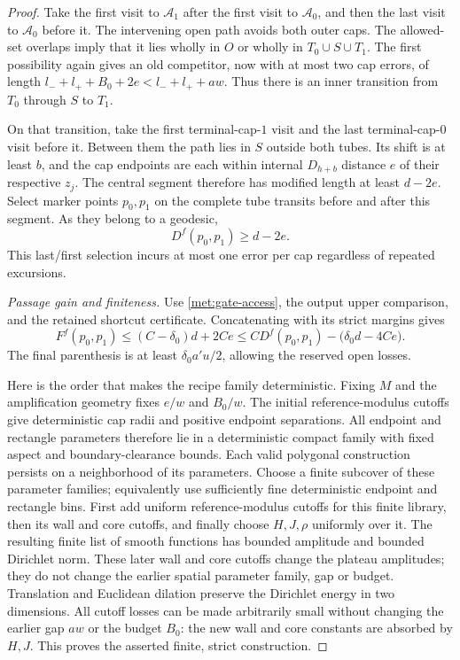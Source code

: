 \documentclass[11pt]{article}
\numberwithin{equation}{section}
\theoremstyle{definition}
\theoremstyle{remark}
\newcommand{\1}{\mathbf 1}
\begin{document}
\begin{proof}
Take the first visit to $\mathcal A_1$ after the first visit to
$\mathcal A_0$, and then the last visit to $\mathcal A_0$ before it.
The intervening open path avoids both outer caps.  The allowed-set
overlaps imply that it lies wholly in $O$ or wholly in
$T_0\cup S\cup T_1$.  The first possibility again gives an old
competitor, now with at most two cap errors, of length
$l_-+l_++B_0+2e<l_-+l_++aw$.  Thus there is an inner transition
from $T_0$ through $S$ to $T_1$.

On that transition, take the first terminal-cap-$1$ visit and the
last terminal-cap-$0$ visit before it.  Between them the path lies
in $S$ outside both tubes.  Its shift is at least $b$, and the cap
endpoints are each within internal $D_{h+b}$ distance $e$ of their
respective $z_j$.  The central segment therefore has modified length
at least $d-2e$.  Select marker points $p_0,p_1$ on the complete tube
transits before and after this segment.  As they belong to a
geodesic,
\[
 D^f(p_0,p_1)\geq d-2e.
\]
This last/first selection incurs at most one error per cap regardless
of repeated excursions.

\emph{Passage gain and finiteness.}
Use \eqref{met:gate-access}, the output upper comparison, and the
retained shortcut certificate.  Concatenating with its strict
margins gives
\[
 F^f(p_0,p_1)
 \leq (C-\delta_0)d+2Ce
 \leq C D^f(p_0,p_1)-\bigl(\delta_0d-4Ce\bigr).
\]
The final parenthesis is at least $\delta_0a'u/2$, allowing the
reserved open losses.

Here is the order that makes the recipe family deterministic.  Fixing
$M$ and the amplification geometry fixes $e/w$ and $B_0/w$.  The
initial reference-modulus cutoffs give deterministic cap radii and
positive endpoint separations.  All endpoint and rectangle parameters
therefore lie in a deterministic compact family with fixed aspect and
boundary-clearance bounds.  Each valid polygonal construction persists
on a neighborhood of its parameters.  Choose a finite subcover of these parameter families;
equivalently use sufficiently fine deterministic endpoint and
rectangle bins.  First add uniform reference-modulus cutoffs for this
finite library, then its wall and core cutoffs, and finally choose
$H,J,\rho$ uniformly over it.  The resulting finite list of smooth
functions has bounded amplitude and bounded Dirichlet norm.
These later wall and core cutoffs change the plateau amplitudes; they
do not change the earlier spatial parameter family, gap or budget.
Translation and Euclidean dilation preserve the Dirichlet energy in
two dimensions.  All cutoff losses can be made arbitrarily small
without changing the earlier gap $aw$ or the budget $B_0$: the new
wall and core constants are absorbed by $H,J$.  This proves the
asserted finite, strict construction.
\end{proof}
\end{document}
